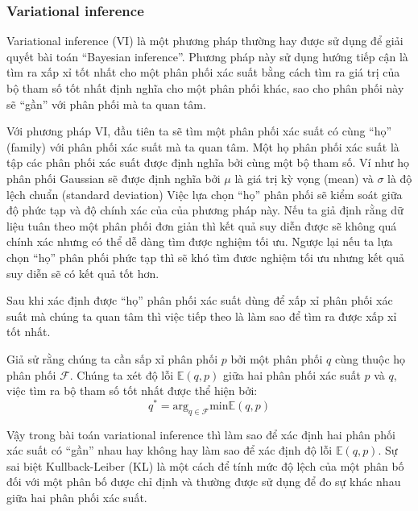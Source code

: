  
        
        \subsubsection{Variational inference}
        Variational inference (VI) là một phương pháp thường hay được sử dụng để giải quyết bài toán ``Bayesian inference''.
        Phương pháp này sử dụng hướng tiếp cận là tìm ra xấp xỉ tốt nhất cho một phân phối xác suất bằng cách tìm ra giá trị của bộ tham số tốt nhất định nghĩa cho một phân phối khác, sao cho phân phối này sẽ ``gần'' với phân phối mà ta quan tâm. 
        
        Với phương pháp VI, đầu tiên ta sẽ tìm một phân phối xác suất có cùng ``họ'' (family) với phân phối xác suất mà ta quan tâm. 
        Một họ phân phối xác suất là tập các phân phối xác suất được định nghĩa bởi cùng một bộ tham số. 
        Ví như họ phân phối Gaussian sẽ được định nghĩa bởi $\mu$ là giá trị kỳ vọng (mean) và $\sigma$ là độ lệch chuẩn (standard deviation)
        Việc lựa chọn ``họ'' phân phối sẽ kiểm soát giữa độ phức tạp và độ chính xác của của phương pháp này. 
        Nếu ta giả định rằng dữ liệu tuân theo một phân phối đơn giản thì kết quả suy diễn được sẽ không quá chính xác nhưng có thể dễ dàng tìm được nghiệm tối ưu. Ngược lại nếu ta lựa chọn ``họ'' phân phối phức tạp thì sẽ khó tìm đươc nghiệm tối ưu nhưng kết quả suy diễn sẽ có kết quả tốt hơn. 

        Sau khi xác định được ``họ'' phân phối xác suất dùng để xấp xỉ phân phối xác suất mà chúng ta quan tâm thì việc tiếp theo là làm sao để tìm ra được xấp xỉ tốt nhất. 
        
        Giả sử rằng chúng ta cần sấp xỉ phân phối $p$ bởi một phân phối $q$ cùng thuộc họ phân phối $\mathcal{F}$.
        Chúng ta xét độ lỗi $\mathbb{E}(q,p)$ giữa hai phân phối xác suất $p$ và $q$, việc tìm ra bộ tham số tốt nhất được thể hiện bởi:
        \begin{equation}
        \label{equal_minErrorpq)}
            q^* = \text{arg}_{q\in\mathcal{F}} \text{min}\mathbb{E}(q,p)    
        \end{equation}
        

        Vậy trong bài toán variational inference thì làm sao để xác định hai phân phối xác suất có ``gần'' nhau hay không hay làm sao để xác định độ lỗi $\mathbb{E}(q,p)$. 
        Sự sai biệt Kullback-Leiber (KL) là một cách để tính mức độ lệch của một phân bố đối với một phân bố được chỉ định và thường được sử dụng để đo sự khác nhau giữa hai phân phối xác suất. 

